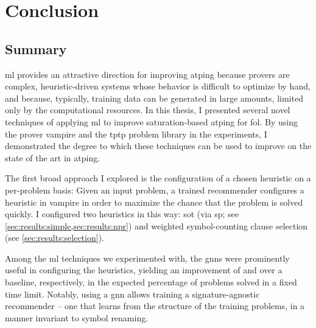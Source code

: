 \chapter{Conclusion}



\section{Summary}

\Gls{ml} provides an attractive direction for improving \gls{atping} because provers are complex, heuristic-driven systems whose behavior is difficult to optimize by hand,
and because, typically, training data can be generated in large amounts, limited only by the computational resources.
In this thesis,
I presented several novel techniques of applying \gls{ml} to improve saturation-based \gls{atping} for \gls{fol}.
By using the prover \gls{vampire} and the \gls{tptp} problem library in the experiments,
I demonstrated the degree to which these techniques can be used to improve on the state of the art in \gls{atping}.

The first broad approach I explored is the configuration of a chosen heuristic on a per-problem basis:
Given an input problem, a trained recommender configures a heuristic in \gls{vampire} in order to maximize the chance that the problem is solved quickly.
I configured two heuristics in this way:
\gls{sot} (via \gls{sp}; see \cref{sec:results:simple,sec:results:npr}) and weighted symbol-counting clause selection (see \cref{sec:results:selection}).

Among the \gls{ml} techniques we experimented with,
the \glspl{gnn} were prominently useful in configuring the heuristics,
yielding an improvement of  and  over a baseline, respectively, in the expected percentage of problems solved in a fixed time limit.
Notably, using a \gls{gnn} allows training a signature-agnostic recommender -- one that learns from the structure of the training problems, in a manner invariant to symbol renaming.


